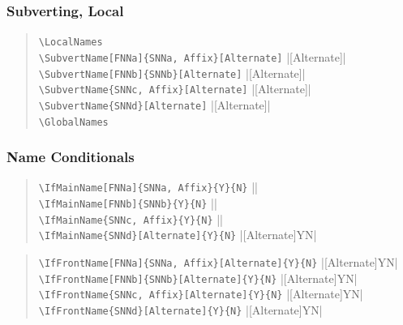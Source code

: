 \documentclass[oneside]{article}
\begin{document}
\subsubsection{Subverting, Local}

\begin{quote}
\Verb+\LocalNames+\LocalNames\\
\Verb+\SubvertName[FNNa]{SNNa, Affix}[Alternate]+\dotfill
  |[Alternate]|\\
\Verb+\SubvertName[FNNb]{SNNb}[Alternate]+\dotfill
  |[Alternate]|\\
\Verb+\SubvertName{SNNc, Affix}[Alternate]+\dotfill
  |[Alternate]|\\
\Verb+\SubvertName{SNNd}[Alternate]+\dotfill
  |[Alternate]|\\
\Verb+\GlobalNames+\GlobalNames
\end{quote}

\subsubsection{Name Conditionals}

\begin{quote}
\Verb+\IfMainName[FNNa]{SNNa, Affix}{Y}{N}+\dotfill
  ||\\
\Verb+\IfMainName[FNNb]{SNNb}{Y}{N}+\dotfill
  ||\\
\Verb+\IfMainName{SNNc, Affix}{Y}{N}+\dotfill
  ||\\
\Verb+\IfMainName{SNNd}[Alternate]{Y}{N}+\dotfill
  |[Alternate]{Y}{N}|
\end{quote}

\begin{quote}
\Verb+\IfFrontName[FNNa]{SNNa, Affix}[Alternate]{Y}{N}+\dotfill
  |[Alternate]{Y}{N}|\\
\Verb+\IfFrontName[FNNb]{SNNb}[Alternate]{Y}{N}+\dotfill
  |[Alternate]{Y}{N}|\\
\Verb+\IfFrontName{SNNc, Affix}[Alternate]{Y}{N}+\dotfill
  |[Alternate]{Y}{N}|\\
\Verb+\IfFrontName{SNNd}[Alternate]{Y}{N}+\dotfill
  |[Alternate]{Y}{N}|
\end{quote}
\end{document}
